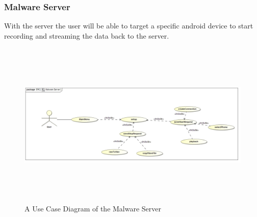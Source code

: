 \documentclass[a4paper,12pt,titlepage]{article}
\begin{document}
	\subsubsection{Malware Server}
	With the server the user will be able to target a specific android device to start recording and streaming the data back to the server.
		\begin{figure}[h!]
 			 \centering
			  \includegraphics[width=16cm,height=8cm]{MalwareServerUseCase}
		 	 \caption{A Use Case Diagram of the Malware Server}
		\end{figure}
\end{document}
